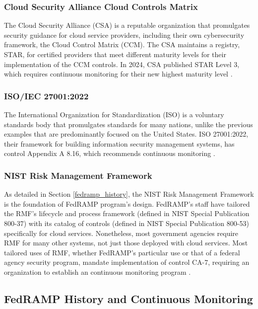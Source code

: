 \documentclass{jdf}
\begin{document}
\subsubsection{Cloud Security Alliance Cloud Controls Matrix}

The Cloud Security Alliance (CSA) is a reputable organization that promulgates security guidance for cloud service providers, including their own cybersecurity framework, the Cloud Control Matrix (CCM). The CSA maintains a registry, STAR, for certified providers that meet different maturity levels for their implementation of the CCM controls. In 2024, CSA published STAR Level 3, which requires continuous monitoring for their new highest maturity level \citeyear{csa_starl3_21}.

\subsubsection{ISO/IEC 27001:2022}

The International Organization for Standardization (ISO) is a voluntary standards body that promulgates standards for many nations, unlike the previous examples that are predominantly focused on the United States. ISO 27001:2022, their framework for building information security management systems, has control Appendix A 8.16, which recommends continuous monitoring \citeyear{iso27001_22}.

\subsubsection{NIST Risk Management Framework} \label{rmf}

As detailed in Section \ref{fedramp_history}, the NIST Risk Management Framework is the foundation of FedRAMP program's design. FedRAMP's staff have tailored the RMF's lifecycle and process framework (defined in NIST Special Publication 800-37) with its catalog of controls (defined in NIST Special Publication 800-53) specifically for cloud services. Nonetheless, most government agencies require RMF for many other systems, not just those deployed with cloud services. Most tailored uses of RMF, whether FedRAMP's particular use or that of a federal agency security program, mandate implementation of control CA-7, requiring an organization to establish an continuous monitoring program \citeyear[pp.~90-91]{sp80053r5}.

\subsection{FedRAMP History and Continuous Monitoring}
\end{document}
